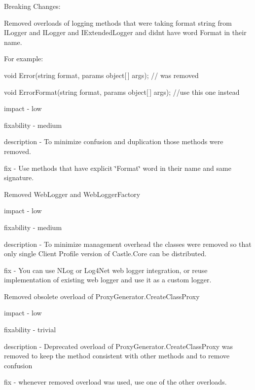 Breaking Changes\+:
\begin{DoxyItemize}
\item Removed overloads of logging methods that were taking format string from I\+Logger and I\+Logger and I\+Extended\+Logger and didn\textquotesingle{}t have word Format in their name.
\begin{DoxyItemize}
\item For example\+:
\begin{DoxyItemize}
\item void Error(string format, params object\mbox{[}$\,$\mbox{]} args); // was removed
\item void Error\+Format(string format, params object\mbox{[}$\,$\mbox{]} args); //use this one instead
\end{DoxyItemize}
\item impact -\/ low
\item fixability -\/ medium
\item description -\/ To minimize confusion and duplication those methods were removed.
\item fix -\/ Use methods that have explicit \char`\"{}\+Format\char`\"{} word in their name and same signature.
\end{DoxyItemize}
\item Removed Web\+Logger and Web\+Logger\+Factory
\begin{DoxyItemize}
\item impact -\/ low
\item fixability -\/ medium
\item description -\/ To minimize management overhead the classes were removed so that only single Client Profile version of Castle.\+Core can be distributed.
\item fix -\/ You can use N\+Log or Log4\+Net web logger integration, or reuse implementation of existing web logger and use it as a custom logger.
\end{DoxyItemize}
\item Removed obsolete overload of Proxy\+Generator.\+Create\+Class\+Proxy
\begin{DoxyItemize}
\item impact -\/ low
\item fixability -\/ trivial
\item description -\/ Deprecated overload of Proxy\+Generator.\+Create\+Class\+Proxy was removed to keep the method consistent with other methods and to remove confusion
\item fix -\/ whenever removed overload was used, use one of the other overloads.

\end{DoxyItemize}
\end{DoxyItemize}
